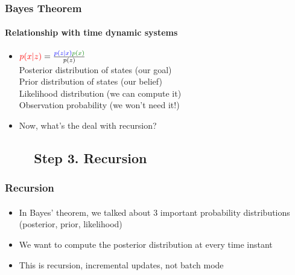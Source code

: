 


\begin{frame}
\frametitle{Bayes Theorem}
\framesubtitle{Relationship with time dynamic systems}
\mypagenum
\begin{itemize}
\item ${\color{red}p(x|z)} = \frac{{\color{blue}p(z|x)}{\color{darkgreen}p(x)}}{p(z)}$\\\vspace{0.2in}
{\color{red}Posterior distribution of states (our goal)}\\
{\color{darkgreen}Prior distribution of states (our belief)}\\
{\color{blue}Likelihood distribution (we can compute it)}\\
Observation probability (we won't need it!)\\\vspace{0.2in}
\item Now, what's the deal with recursion?
\end{itemize}
\end{frame}




\subsection{\ \ \ \ Step 3. Recursion}
\begin{frame}
\frametitle{Recursion}
\framesubtitle{}
\mypagenum
\begin{itemize}
\item In Bayes' theorem, we talked about 3 important probability distributions (posterior, prior, likelihood)
\item We want to compute the posterior distribution at every time instant
\item This is recursion, incremental updates, not batch mode
\end{itemize}
\end{frame}




